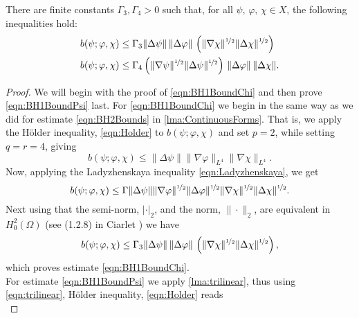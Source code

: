 \begin{lemma} \label{lma:BH1Bound}
  There are finite constants $\Gamma_3,\Gamma_4>0$ such that, for all
  $\psi,\, \varphi,\, \chi \in X$, the following inequalities hold:
  \begin{align}
    b(\psi;\varphi,\chi) &\le \Gamma_3 \|\Delta \psi\|\, \|\Delta \varphi\|\,
      \left(\|\nabla \chi\|^{\nicefrac{1}{2}}
      \|\Delta \chi\|^{\nicefrac{1}{2}}\right) \label{eqn:BH1BoundChi} \\
    b(\psi;\varphi,\chi) &\le \Gamma_4 \left(\|\nabla \psi\|^{\nicefrac{1}{2}}
      \|\Delta \psi\|^{\nicefrac{1}{2}}\right)\,
      \|\Delta \varphi\|\, \|\Delta \chi\|. \label{eqn:BH1BoundPsi}
  \end{align}
\end{lemma}
\begin{proof}
  We will begin with the proof of \eqref{eqn:BH1BoundChi} and then prove
  \eqref{eqn:BH1BoundPsi} last. For \eqref{eqn:BH1BoundChi} we begin in the same
  way as we did for estimate \eqref{eqn:BH2Bounds} in \autoref{lma:ContinuousForms}.
  That is, we apply the H\"older inequality, \eqref{eqn:Holder} to $b(\psi;
  \varphi, \chi)$ and set $p=2$, while setting $q=r=4$, giving
  \begin{equation*}
    b(\psi;\varphi,\chi) \le \|\Delta \psi\| \|\nabla \varphi\|_{L^4} \|\nabla
      \chi\|_{L^4}.
  \end{equation*}
  Now, applying the Ladyzhenskaya inequality \eqref{eqn:Ladyzhenskaya}, we get
  \begin{equation*}
    b(\psi;\varphi,\chi) \le \Gamma \|\Delta \psi\|
      \|\nabla \varphi\|^{\nicefrac{1}{2}} \|\Delta \varphi\|^{\nicefrac{1}{2}}
      \|\nabla \chi\|^{\nicefrac{1}{2}} \|\Delta \chi\|^{\nicefrac{1}{2}}.
  \end{equation*}
  Next using that the semi-norm, $|\cdot|_2$, and the norm, $\|\cdot\|_2$, are
  equivalent in $H^2_0(\Omega)$ (see (1.2.8) in Ciarlet \cite{Ciarlet}) we have
  \begin{equation*}
    b(\psi;\varphi,\chi) \le \Gamma_3 \|\Delta \psi\|\, \|\Delta \varphi\|\,
      \left(\|\nabla \chi\|^{\nicefrac{1}{2}}
      \|\Delta \chi\|^{\nicefrac{1}{2}}\right),
  \end{equation*}
  which proves estimate \eqref{eqn:BH1BoundChi}. \\
  For estimate \eqref{eqn:BH1BoundPsi} we apply \autoref{lma:trilinear},
  thus using \eqref{eqn:trilinear}, H\"older inequality, \eqref{eqn:Holder} reads
  \begin{equation}

\end{equation}
\end{proof}
